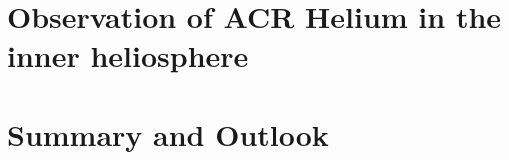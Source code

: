 \documentclass[ twoside,openright,titlepage,numbers=noenddot,headinclude,%
footinclude=true,cleardoublepage=empty,abstractoff, %
BCOR=12mm,paper=a4,fontsize=11pt,%
ngerman,american]{scrreprt} %
\begin{document}


\chapter{Observation of ACR Helium in the inner heliosphere}
\label{chp:ACR_Helium}



\chapter{Summary and Outlook}
\label{chp:outlook}




\newpage
\markboth{}{\thepage}
\cleardoublepage
{}
{}

\printbibliography

\cleardoublepage


\cleardoublepage
\appendix


%

%


\cleardoublepage


\cleardoublepage

	
\end{document}
